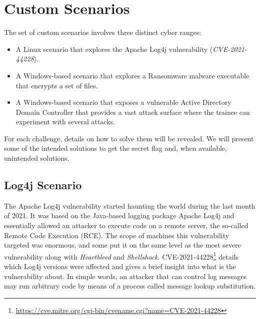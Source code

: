 \section{Custom Scenarios} \label{sec:validation_custom_scenarios}

The set of custom scenarios involves three distinct cyber ranges:

\begin{itemize}
    \item A Linux scenario that explores the Apache Log4j vulnerability (\textit{CVE-2021-44228}).
    \item A Windows-based scenario that explores a Ransomware malware executable that encrypts a set of files.
    \item A Windows-based scenario that exposes a vulnerable Active Directory Domain Controller that provides a vast attack surface where the trainee can experiment with several attacks. 
\end{itemize}

For each challenge, details on how to solve them will be revealed. We will present some of the intended solutions to get the secret flag and, when available, unintended solutions.

\subsection{Log4j Scenario} \label{sec:validation_log4j_scenario}

The Apache Log4j vulnerability started haunting the world during the last month of 2021. It was based on the Java-based logging package Apache Log4j and essentially allowed an attacker to execute code on a remote server, the so-called Remote Code Execution (RCE). The scope of machines this vulnerability targeted was enormous, and some put it on the same level as the most severe vulnerability along with \textit{Heartbleed} and \textit{Shellshock}. CVE-2021-44228\footnote{\url{https://cve.mitre.org/cgi-bin/cvename.cgi?name=CVE-2021-44228}} details which Log4j versions were affected and gives a brief insight into what is the vulnerability about. In simple words, an attacker that can control log messages may run arbitrary code by means of a process called message lookup substitution.

